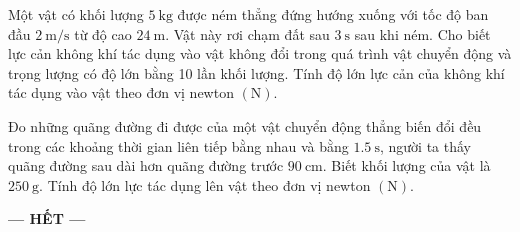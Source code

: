 \begin{ex}
	Một vật có khối lượng $\SI{5}{\kilogram}$ được ném thẳng đứng hướng xuống với tốc độ ban đầu $\SI{2}{\meter/\second}$ từ độ cao $\SI{24}{\meter}$. Vật này rơi chạm đất sau $\SI{3}{\second}$ sau khi ném. Cho biết lực cản không khí tác dụng vào vật không đổi trong quá trình vật chuyển động và trọng lượng có độ lớn bằng 10 lần khối lượng. Tính độ lớn lực cản của không khí tác dụng vào vật theo đơn vị newton $\left(\si{\newton}\right)$.
	\loigiai{
		
	}
\end{ex}
\begin{ex}
Đo những quãng đường đi được của một vật chuyển động thẳng biến đổi đều trong các khoảng thời gian liên tiếp bằng nhau và bằng $\SI{1.5}{\second}$, người ta thấy quãng đường sau dài hơn quãng đường trước $\SI{90}{\centi\meter}$. Biết khối lượng của vật là $\SI{250}{\gram}$. Tính độ lớn lực tác dụng lên vật theo đơn vị newton $\left(\si{\newton}\right)$. 	
	\loigiai{
		
	}
\end{ex}
\begin{center}
	\textbf{--- HẾT ---}
\end{center}